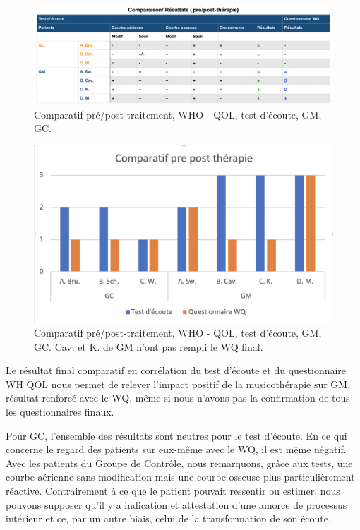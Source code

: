 \begin{figure}
\centering
\includegraphics[width=\linewidth]{images/graphiques/comparaison_pre_post.png}
\caption[Corrélation résultats pré/post]{Comparatif
  pré/post-traitement, WHO - QOL, test d'écoute, GM, GC.}

\label{comparaison_pre_post}
\end{figure}
\begin{figure}
\centering
\includegraphics[width=\linewidth]{images/graphiques/comparatifWQecoute.png}
\caption[Comparatif résultats pré/post]{Comparatif
  pré/post-traitement, WHO - QOL, test d'écoute, GM, GC. 
   Cav. et K. de GM n'ont pas rempli le WQ final.}

\label{comparaison_pre_post}
\end{figure}

Le résultat final comparatif en corrélation du test d'écoute et du questionnaire WH QOL nous permet
                de relever l'impact positif de la
                musicothérapie sur GM, résultat renforcé
                avec le WQ, même si nous n'avons pas la confirmation de tous les questionnaires finaux.


                Pour GC, l'ensemble des résultats sont neutres pour le
                test d'écoute. En ce qui concerne le
                regard des patients sur eux-même avec le WQ, il est
                même négatif. Avec les patients du Groupe de
              Contrôle, nous remarquons, grâce aux tests, une courbe aérienne
              sans modification mais une courbe osseuse plus
              particulièrement réactive. Contrairement à
              ce que le patient pouvait ressentir ou estimer, nous pouvons supposer qu'il y a indication  et attestation d'une amorce de
              processus intérieur et ce, par un autre biais, celui de
              la transformation de son
              écoute.


